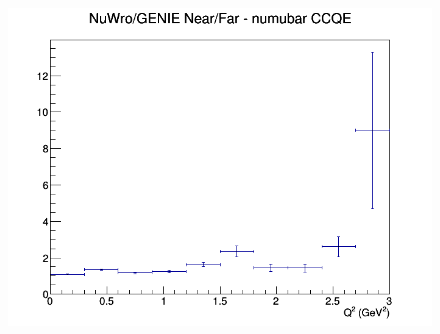 \begin{figure}[h]
\endminipage
{}
\includegraphics[width=\linewidth]{eff_Q2/FGT/ratios/CCQE_NuWro_GENIE_numubar_NF_Q2.png}
\endminipage
\newline
\end{figure}
\clearpage
